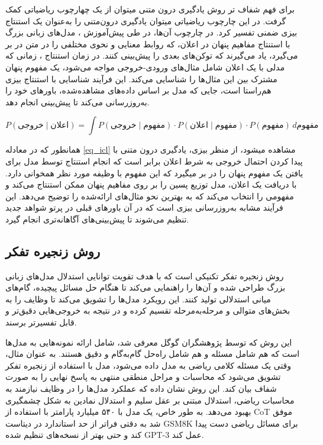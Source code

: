 برای فهم شفاف تر روش یادگیری درون متنی میتوان از یک چهارچوب ریاضیاتی
\cite{beysian}
 کمک گرفت. در این چارچوب ریاضیاتی می\/توان یادگیری درون‌متنی را به‌عنوان یک استنتاج بیزی ضمنی
 تفسیر کرد. در چارچوب آن‌ها، در طی پیش‌آموزش
 ، مدل‌های زبانی بزرگ با استنتاج مفاهیم پنهان در اعلان، که روابط معنایی و نحوی مختلفی را در متن در بر می‌گیرد، یاد می‌گیرند که توکن‌های بعدی را پیش‌بینی کنند. در زمان استنتاج
 ، زمانی که مدلی با یک اعلان شامل مثال‌های ورودی-خروجی مواجه می‌شود، یک مفهوم پنهان مشترک بین این مثال‌ها را شناسایی می‌کند. این فرآیند شناسایی با استنتاج بیزی هم‌راستا است، جایی که مدل بر اساس داده‌های مشاهده‌شده، باورهای خود را به‌روزرسانی می‌کند تا پیش‌بینی انجام دهد.

\begin{equation}\label{eq_icl}
	P(\text{خروجی} \mid \text{اعلان}) = \int P(\text{خروجی} \mid \text{مفهوم}) \cdot P(\text{اعلان} \mid \text{مفهوم}) \cdot P( \text{مفهوم}) \, d \text{مفهوم}
\end{equation}



همانطور که در معادله \ref{eq_icl} مشاهده می\/شود، از منظر بیزی، یادگیری درون متنی با پیدا کردن احتمال خروجی به شرط اعلان برابر است که انجام استنتاج توسط مدل برای یافتن یک مفهوم پنهان را در بر می\/گیرد که این مفهوم با وظیفه مورد نظر همخوانی دارد. با دریافت یک اعلان، مدل توزیع پسین
 را بر روی مفاهیم پنهان ممکن استنتاج می‌کند و مفهومی را انتخاب می‌کند که به بهترین نحو مثال‌های ارائه‌شده را توضیح می‌دهد. این فرآیند مشابه به‌روزرسانی بیزی است که در آن باورهای قبلی در پرتو شواهد جدید تنظیم می‌شوند تا پیش‌بینی‌های آگاهانه‌تری انجام گیرد.

\subsection{روش زنجیره تفکر}
روش زنجیره تفکر
 \cite{CoT}
 تکنیکی است که با هدف تقویت توانایی استدلال مدل‌های زبانی بزرگ طراحی شده و آن‌ها را راهنمایی می‌کند تا هنگام حل مسائل پیچیده، گام‌های میانی استدلالی تولید کنند. این رویکرد مدل‌ها را تشویق می‌کند تا وظایف را به بخش‌های متوالی و مرحله‌به‌مرحله تقسیم کرده و در نتیجه به خروجی‌هایی دقیق‌تر و قابل تفسیرتر برسند.

این روش که توسط پژوهشگران گوگل معرفی شد، شامل ارائه نمونه‌هایی به مدل‌ها است که هم شامل مسئله و هم شامل راه‌حل گام‌به‌گام و دقیق هستند. به عنوان مثال، وقتی یک مسئله کلامی ریاضی به مدل داده می‌شود، مدل با استفاده از زنجیره تفکر تشویق می‌شود که محاسبات و مراحل منطقی منتهی به پاسخ نهایی را به صورت شفاف بیان کند. این روش نشان داده که عملکرد مدل‌ها را در وظایف نیازمند به محاسبات ریاضی، استدلال مبتنی بر عقل سلیم و استدلال نمادین به شکل چشمگیری بهبود می‌دهد. به طور خاص، یک مدل با ۵۴۰ میلیارد پارامتر با استفاده از CoT موفق شد به دقتی فراتر از حد استاندارد در دیتاست GSM8K برای مسائل ریاضی دست پیدا کند و حتی بهتر از نسخه‌های تنظیم شده GPT-3 عمل کند.

